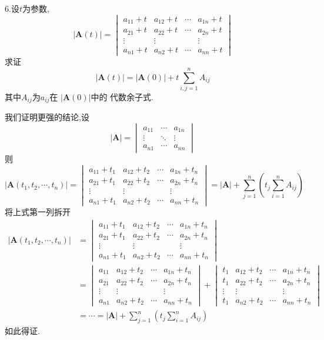 6.设$t$为参数,
\[
\left|\bm{A}\left(t\right)\right|
=\begin{vmatrix}
	a_{11}+t & a_{12}+t & \cdots &a_{1n}+t\\
	a_{21}+t & a_{22}+t & \cdots &a_{2n}+t\\
	\vdots &\vdots&&\vdots
	\\
	a_{n1}+t & a_{n2}+t & \cdots &a_{nn}+t
\end{vmatrix}
\]
求证
\[
\left|\bm{A}\left(t\right)\right|
=\left|\bm{A}\left(0\right)\right|
+t\sum_{i,j=1}^{n}A_{ij}
\]
其中$A_{ij}$为$a_{ij}$在
$\left|\bm{A}\left(0\right)\right|$中的
代数余子式.
\begin{Proof}
	我们证明更强的结论,设
	\[
	\left|\bm{A}\right|
	=\begin{vmatrix}
	a_{11} & \cdots & a_{1n}\\
	\vdots &\ddots&\vdots\\
	a_{n1}&\cdots &a_{nn}
\end{vmatrix}
	\]
	则
	\[
	\left|\bm{A}\left(
		t_1,t_2,\cdots,t_n
	\right)\right|
	=\begin{vmatrix}
	a_{11}+t_1 & a_{12}+t_2&
	\cdots & a_{1n}+t_n\\
	a_{21}+t_1 & a_{22}+t_2&
	\cdots & a_{2n}+t_n\\
	\vdots &\vdots&&\vdots\\
	a_{n1}+t_1&a_{n2}+t_2&
	\cdots &a_{nn}+t_n
\end{vmatrix}
=\left|\bm{A}\right|
+\sum_{j=1}^{n}\left(
	t_j\sum_{i=1}^{n}
	A_{ij}
\right)
	\]
	将上式第一列拆开
	\begin{align*}
		\left|\bm{A}\left(
		t_1,t_2,\cdots,t_n
	\right)\right|
	&=\begin{vmatrix}
	a_{11}+t_1 & a_{12}+t_2&
	\cdots & a_{1n}+t_n\\
	a_{21}+t_1 & a_{22}+t_2&
	\cdots & a_{2n}+t_n\\
	\vdots &\vdots&&\vdots\\
	a_{n1}+t_1&a_{n2}+t_2&
	\cdots &a_{nn}+t_n
\end{vmatrix}\\
&=\begin{vmatrix}
	a_{11} & a_{12}+t_2&
	\cdots & a_{1n}+t_n\\
	a_{21} & a_{22}+t_2&
	\cdots & a_{2n}+t_n\\
	\vdots &\vdots&&\vdots\\
	a_{n1}&a_{n2}+t_2&
	\cdots &a_{nn}+t_n
\end{vmatrix}+
\begin{vmatrix}
	t_1 & a_{12}+t_2&
	\cdots & a_{1n}+t_n\\
	t_1 & a_{22}+t_2&
	\cdots & a_{2n}+t_n\\
	\vdots &\vdots&&\vdots\\
	t_1&a_{n2}+t_2&
	\cdots &a_{nn}+t_n
\end{vmatrix}\\
&=\cdots=
\left|\bm{A}\right|
+\sum_{j=1}^{n}\left(
	t_j\sum_{i=1}^{n}
	A_{ij}
	\right)
	\end{align*}
如此得证.
	\qedhere
\end{Proof}

